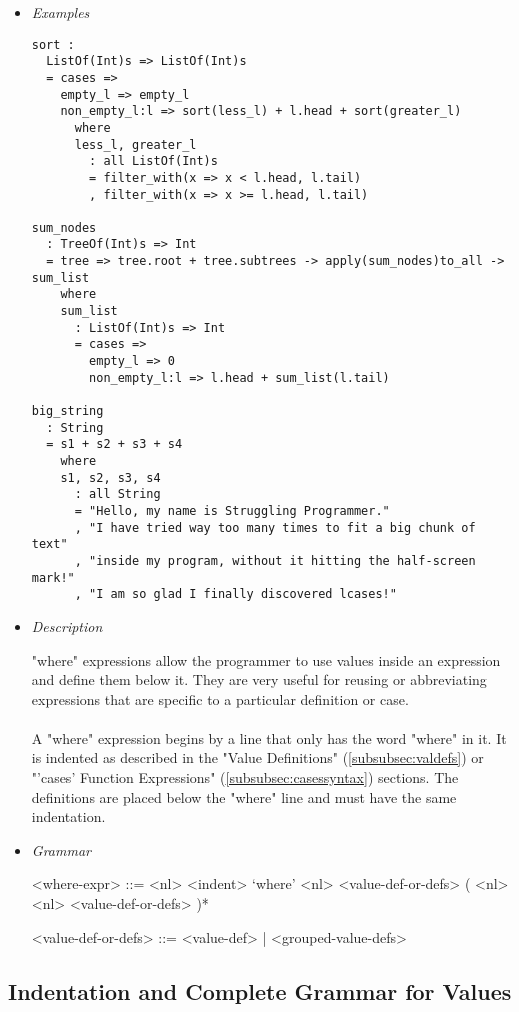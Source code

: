 \documentclass{article}
\begin{document}
\begin{itemize}

\item \textit{Examples}
\begin{verbatim}
sort :
  ListOf(Int)s => ListOf(Int)s
  = cases => 
    empty_l => empty_l
    non_empty_l:l => sort(less_l) + l.head + sort(greater_l)
      where
      less_l, greater_l
        : all ListOf(Int)s
        = filter_with(x => x < l.head, l.tail)
        , filter_with(x => x >= l.head, l.tail)

sum_nodes
  : TreeOf(Int)s => Int
  = tree => tree.root + tree.subtrees -> apply(sum_nodes)to_all -> sum_list
    where
    sum_list
      : ListOf(Int)s => Int
      = cases =>
        empty_l => 0
        non_empty_l:l => l.head + sum_list(l.tail)

big_string
  : String
  = s1 + s2 + s3 + s4
    where
    s1, s2, s3, s4
      : all String
      = "Hello, my name is Struggling Programmer."
      , "I have tried way too many times to fit a big chunk of text"
      , "inside my program, without it hitting the half-screen mark!"
      , "I am so glad I finally discovered lcases!"
\end{verbatim}

\item \textit{Description}

"where" expressions allow the programmer to use values inside an expression and
define them below it. They are very useful for reusing or abbreviating
expressions that are specific to a particular definition or case.
\\\\
A "where" expression begins by a line that only has the word "where" in it. It is
indented as described in the "Value Definitions" (\ref{subsubsec:valdefs}) or
"'cases' Function Expressions" (\ref{subsubsec:casessyntax}) sections.  The
definitions are placed below the "where" line and must have the same
indentation. 

\item \textit{Grammar}
\begin{grammar}
<where-expr> ::=
<nl> <indent> `where' <nl> <value-def-or-defs> ( <nl> <nl> <value-def-or-defs> )*

<value-def-or-defs> ::= <value-def> | <grouped-value-defs> 
\end{grammar}

\end{itemize}

\subsection{Indentation and Complete Grammar for Values}
\end{document}
